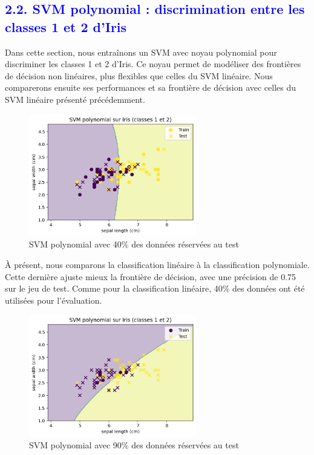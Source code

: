 \documentclass[
  12pt,
]{article}
\begin{document}
\subsection{\texorpdfstring{\textcolor{blue}{2.2. SVM polynomial : discrimination entre les classes 1 et 2 d’Iris}}{}}\label{section-3}

Dans cette section, nous entraînons un SVM avec noyau polynomial pour
discriminer les classes 1 et 2 d'Iris. Ce noyau permet de modéliser des
frontières de décision non linéaires, plus flexibles que celles du SVM
linéaire. Nous comparerons ensuite ses performances et sa frontière de
décision avec celles du SVM linéaire présenté précédemment.

\begin{figure}[H]
    \centering
    \includegraphics[width=0.65\textwidth]{vis/classif_poly_40test_60train.png}
    \caption{SVM polynomial avec 40\% des données réservées au test}
    \label{fig:svm_poly_iris_40test_60train}
\end{figure}

À présent, nous comparons la classification linéaire à la classification
polynomiale. Cette dernière ajuste mieux la frontière de décision, avec
une précision de 0.75 sur le jeu de test. Comme pour la classification
linéaire, 40\% des données ont été utilisées pour l'évaluation.

\begin{figure}[H]
    \centering
    \includegraphics[width=0.65\textwidth]{vis/classif_poly_90test_10train.png}
    \caption{SVM polynomial avec 90\% des données réservées au test}
    \label{fig:svm_poly_iris_90test_10train}
\end{figure}
\end{document}
